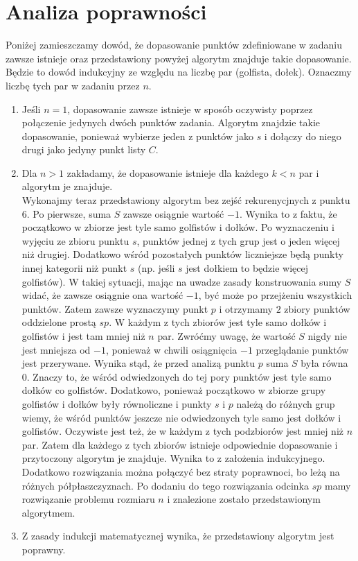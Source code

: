 \documentclass{article}
\begin{document}
\section{Analiza poprawności}
Poniżej zamieszczamy dowód, że dopasowanie punktów zdefiniowane w zadaniu zawsze istnieje oraz przedstawiony powyżej algorytm znajduje takie dopasowanie. Będzie to dowód indukcyjny ze względu na liczbę par (golfista, dołek). 
Oznaczmy liczbę tych par w zadaniu przez $n$. 

\begin{enumerate}
\item Jeśli $n=1$, dopasowanie zawsze istnieje w sposób oczywisty poprzez połączenie jedynych dwóch punktów zadania. Algorytm znajdzie takie dopasowanie, ponieważ wybierze jeden z punktów jako $s$ i dołączy do niego drugi jako jedyny punkt listy $C$.
\item Dla $n>1$ zakładamy, że dopasowanie istnieje dla każdego $k<n$ par i algorytm je znajduje.\\
Wykonajmy teraz przedstawiony algorytm bez zejść rekurenycjnych z punktu 6. Po pierwsze, suma $S$ zawsze osiągnie wartość $-1$. Wynika to z faktu, że początkowo w zbiorze jest tyle samo golfistów i dołków. Po wyznaczeniu i wyjęciu ze zbioru punktu $s$, punktów jednej z tych grup jest o jeden więcej niż drugiej. Dodatkowo wśród pozostałych punktów liczniejsze będą punkty innej kategorii niż punkt $s$ (np. jeśli $s$ jest dołkiem to będzie więcej golfistów). W takiej sytuacji, mając na uwadze zasady konstruowania sumy $S$ widać, że zawsze osiągnie ona wartość $-1$, być może po przejżeniu wszystkich punktów. Zatem zawsze wyznaczymy punkt $p$ i otrzymamy $2$ zbiory punktów oddzielone prostą $sp$. W każdym z tych zbiorów jest tyle samo dołków i golfistów i jest tam mniej niż $n$ par.  Zwróćmy uwagę, że wartość $S$ nigdy nie jest mniejsza od $-1$, ponieważ w chwili osiągnięcia $-1$ przeglądanie punktów jest przerywane. Wynika stąd, że przed analizą punktu $p$ suma $S$ była równa $0$. Znaczy to, że wśród odwiedzonych do tej pory punktów jest tyle samo dołków co golfistów. Dodatkowo, ponieważ początkowo w zbiorze grupy golfistów i dołków były równoliczne i punkty $s$ i $p$ należą do różnych grup wiemy, że wśród punktów jeszcze nie odwiedzonych tyle samo jest dołków i golfistów. Oczywiste jest też, że w każdym z tych podzbiorów jest mniej niż $n$ par. Zatem dla każdego z tych zbiorów istnieje odpowiednie dopasowanie i przytoczony algorytm je znajduje. Wynika to z założenia indukcyjnego. Dodatkowo rozwiązania można połączyć bez straty poprawnoci, bo leżą na różnych półpłaszczyznach. Po dodaniu do tego rozwiązania odcinka $sp$ mamy rozwiązanie problemu rozmiaru $n$ i znalezione zostało przedstawionym algorytmem.
\item Z zasady indukcji matematycznej wynika, że przedstawiony algorytm jest poprawny.
\end{enumerate}
\end{document}

